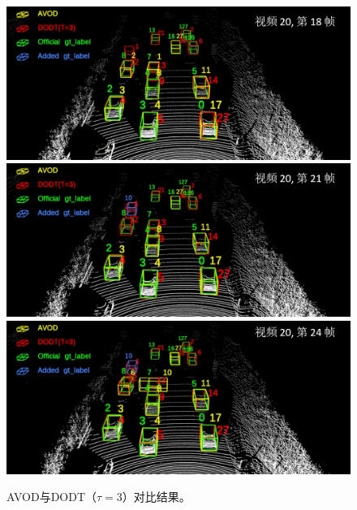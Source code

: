 \begin{figure}[t]
	\centering
	\includegraphics[width=\textwidth]{./imgs/viz_results/val/avod_dodt_01.png}\vspace{1pt}
	\includegraphics[width=\textwidth]{./imgs/viz_results/val/avod_dodt_02.png}\vspace{1pt}
	\includegraphics[width=\textwidth]{./imgs/viz_results/val/avod_dodt_03.png}
	\caption{AVOD与DODT（$\tau=3$）对比结果。}
	\label{fig:avod_dodt}
\end{figure}


